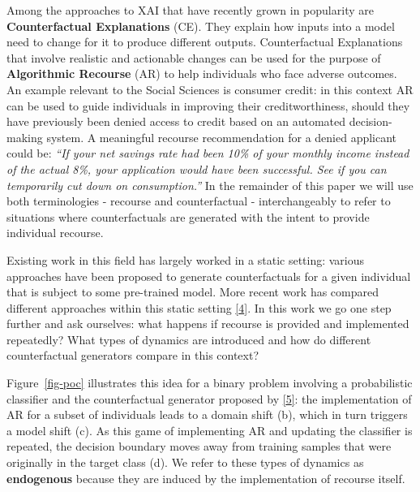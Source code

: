 \documentclass[
  conference]{IEEEtran}
\begin{document}
Among the approaches to XAI that have recently grown in popularity are
\textbf{Counterfactual Explanations} (CE). They explain how inputs into
a model need to change for it to produce different outputs.
Counterfactual Explanations that involve realistic and actionable
changes can be used for the purpose of \textbf{Algorithmic Recourse}
(AR) to help individuals who face adverse outcomes. An example relevant
to the Social Sciences is consumer credit: in this context AR can be
used to guide individuals in improving their creditworthiness, should
they have previously been denied access to credit based on an automated
decision-making system. A meaningful recourse recommendation for a
denied applicant could be: \emph{``If your net savings rate had been
10\% of your monthly income instead of the actual 8\%, your application
would have been successful. See if you can temporarily cut down on
consumption.''} In the remainder of this paper we will use both
terminologies - recourse and counterfactual - interchangeably to refer
to situations where counterfactuals are generated with the intent to
provide individual recourse.

Existing work in this field has largely worked in a static setting:
various approaches have been proposed to generate counterfactuals for a
given individual that is subject to some pre-trained model. More recent
work has compared different approaches within this static setting
\protect\hyperlink{ref-pawelczyk2021carla}{{[}4{]}}. In this work we go
one step further and ask ourselves: what happens if recourse is provided
and implemented repeatedly? What types of dynamics are introduced and
how do different counterfactual generators compare in this context?

Figure~\ref{fig-poc} illustrates this idea for a binary problem
involving a probabilistic classifier and the counterfactual generator
proposed by \protect\hyperlink{ref-wachter2017counterfactual}{{[}5{]}}:
the implementation of AR for a subset of individuals leads to a domain
shift (b), which in turn triggers a model shift (c). As this game of
implementing AR and updating the classifier is repeated, the decision
boundary moves away from training samples that were originally in the
target class (d). We refer to these types of dynamics as
\textbf{endogenous} because they are induced by the implementation of
recourse itself.
\end{document}
